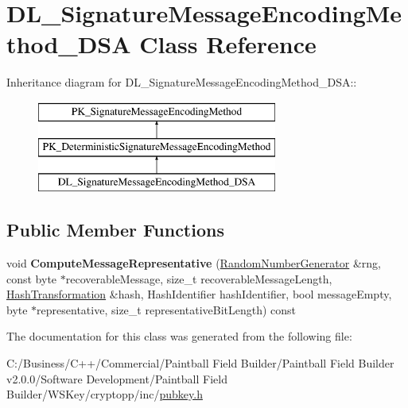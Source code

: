 \hypertarget{class_d_l___signature_message_encoding_method___d_s_a}{
\section{DL\_\-SignatureMessageEncodingMethod\_\-DSA Class Reference}
\label{class_d_l___signature_message_encoding_method___d_s_a}
}
Inheritance diagram for DL\_\-SignatureMessageEncodingMethod\_\-DSA::\begin{figure}[H]
\begin{center}
\leavevmode
\includegraphics[height=3cm]{class_d_l___signature_message_encoding_method___d_s_a}
\end{center}
\end{figure}
\subsection*{Public Member Functions}
\begin{DoxyCompactItemize}
\item 
\hypertarget{class_d_l___signature_message_encoding_method___d_s_a_a59b2500db20a98787fecb272bc0754fe}{
void {\bfseries ComputeMessageRepresentative} (\hyperlink{class_random_number_generator}{RandomNumberGenerator} \&rng, const byte $\ast$recoverableMessage, size\_\-t recoverableMessageLength, \hyperlink{class_hash_transformation}{HashTransformation} \&hash, HashIdentifier hashIdentifier, bool messageEmpty, byte $\ast$representative, size\_\-t representativeBitLength) const }
\label{class_d_l___signature_message_encoding_method___d_s_a_a59b2500db20a98787fecb272bc0754fe}

\end{DoxyCompactItemize}


The documentation for this class was generated from the following file:\begin{DoxyCompactItemize}
\item 
C:/Business/C++/Commercial/Paintball Field Builder/Paintball Field Builder v2.0.0/Software Development/Paintball Field Builder/WSKey/cryptopp/inc/\hyperlink{pubkey_8h}{pubkey.h}\end{DoxyCompactItemize}

